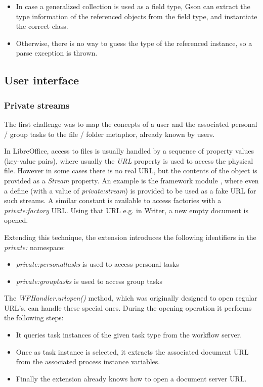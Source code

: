 \begin{itemize}
\item In case a generalized collection is used as a field type, Gson can extract the type information of the referenced objects from the field type, and instantiate the correct class.
\item Otherwise, there is no way to guess the type of the referenced instance, so a parse exception is thrown.
\end{itemize}

\subsection{User interface}

\subsubsection*{Private streams}

The first challenge was to map the concepts of a user and the associated
personal / group tasks to the file / folder metaphor, already known by users.

In LibreOffice, access to files is usually handled by a sequence of property
values (key-value pairs), where usually the \emph{URL} property is used to
access the physical file. However in some cases there is no real URL, but the
contents of the object is provided as a \emph{Stream} property.  An example is
the framework module \cite{lo-framework-module}, where even a define (with a
value of \emph{private:stream}) is provided to be used as a fake URL for such
streams.  A similar constant is available to access factories with a
\emph{private:factory} URL. Using that URL e.g. in Writer, a new empty document
is opened.

Extending this technique, the extension introduces the following identifiers in
the \emph{private:} namespace:

\begin{itemize}
\item \emph{private:personaltasks} is used to access personal tasks
\item \emph{private:grouptasks} is used to access group tasks
\end{itemize}

The \emph{WFHandler.urlopen()} method, which was originally designed to open
regular URL's, can handle these special ones. During the opening operation it performs the following steps:

\begin{itemize}
\item It queries task instances of the given task type from the workflow server.
\item Once as task instance is selected, it extracts the associated document URL from the associated process instance variables.
\item Finally the extension already knows how to open a document server URL.
\end{itemize}

